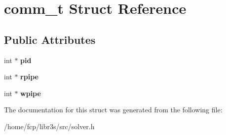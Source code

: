 \hypertarget{structcomm__t}{}\section{comm\+\_\+t Struct Reference}
\label{structcomm__t}
\subsection*{Public Attributes}
\begin{DoxyCompactItemize}
\item 
\mbox{\label{structcomm__t_a52d36411b36c3d17580396082f861175}} 
int $\ast$ {\bfseries pid}
\item 
\mbox{\label{structcomm__t_aa2def6a0a4c8a915bf4bdf71b78d7135}} 
int $\ast$ {\bfseries rpipe}
\item 
\mbox{\label{structcomm__t_a12a48b9d376410035511c5a51f9fc062}} 
int $\ast$ {\bfseries wpipe}
\end{DoxyCompactItemize}


The documentation for this struct was generated from the following file\+:\begin{DoxyCompactItemize}
\item 
/home/fcp/libr3s/src/solver.\+h\end{DoxyCompactItemize}
